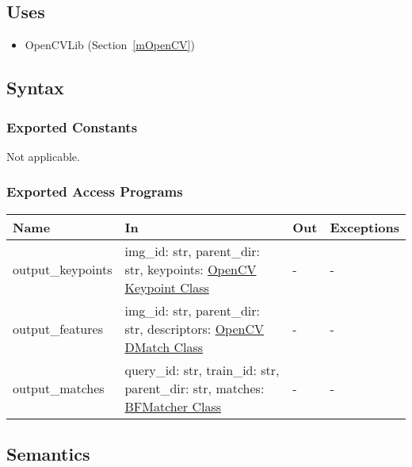 \documentclass[12pt, titlepage]{article}
\begin{document}
\subsection{Uses}
\begin{itemize}
  \item OpenCVLib (Section~\ref{mOpenCV})
\end{itemize}

\subsection{Syntax}

\subsubsection{Exported Constants}
Not applicable.
\subsubsection{Exported Access Programs}

\begin{center}
  \begin{tabular}{p{3cm} p{4cm} p{4cm} p{2cm}}
  \hline
  \textbf{Name} & \textbf{In} & \textbf{Out} & \textbf{Exceptions} \\
  \hline
  output\_keypoints 
  & img\_id: str, \newline
  parent\_dir: str, \newline
  keypoints: \href{https://docs.opencv.org/3.4/d2/d29/classcv_1_1KeyPoint.html}{OpenCV Keypoint Class}
  & -  
  & - \\
  \hline
  output\_features 
  & img\_id: str, \newline
  parent\_dir: str, \newline
  descriptors: \href{https://docs.opencv.org/3.4/d4/de0/classcv_1_1DMatch.html}{OpenCV DMatch Class}
  & - 
  & - \\
  \hline
  output\_matches 
  & query\_id: str, \newline
  train\_id: str, \newline
  parent\_dir: str, \newline
  matches: \href{https://docs.opencv.org/3.4/d3/da1/classcv_1_1BFMatcher.html}{BFMatcher Class}
  & - 
  & - \\
  \hline
  \end{tabular}
  \end{center}
  
  \subsection{Semantics}
  
\end{document}
